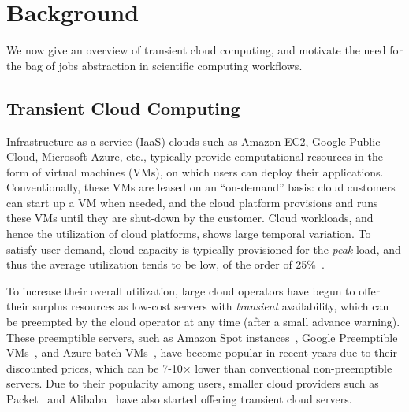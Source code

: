 \vspace*{\subsecspace}
\vspace*{-0.2cm}
\section{Background}

We now give an overview of transient cloud computing, and motivate the need for the bag of jobs abstraction in scientific computing workflows.

\vspace*{\subsecspace}
\subsection{Transient Cloud Computing}

Infrastructure as a service (IaaS) clouds such as Amazon EC2, Google Public Cloud, Microsoft Azure, etc., typically provide computational resources in the form of virtual machines (VMs), on which users can deploy their applications.
Conventionally, these VMs are leased on an ``on-demand'' basis: cloud customers can start up a VM when needed, and the cloud platform provisions and runs these VMs until they are shut-down by the customer. 
Cloud workloads, and hence the utilization of cloud platforms, shows large temporal variation. 
To satisfy user demand, cloud capacity is typically provisioned for the \emph{peak} load, and thus the average utilization tends to be low, of the order of 25\%~\cite{borg,resource-central-sosp17}. 


To increase their overall utilization, large cloud operators have begun to offer their surplus resources as low-cost servers with \emph{transient} availability, which can be preempted by the cloud operator at any time (after a small advance warning). 
These preemptible servers, such as Amazon Spot instances~\cite{ec2-spot}, Google Preemptible VMs~\cite{preemptible-documentation}, and Azure batch VMs~\cite{azure-batch}, have become popular in recent years due to their discounted prices, which can be 7-10$\times$ lower than conventional non-preemptible servers. 
Due to their popularity among users, smaller cloud providers such as Packet~\cite{packet-spot} and Alibaba~\cite{alibaba-spot} have also started offering transient cloud servers. 

